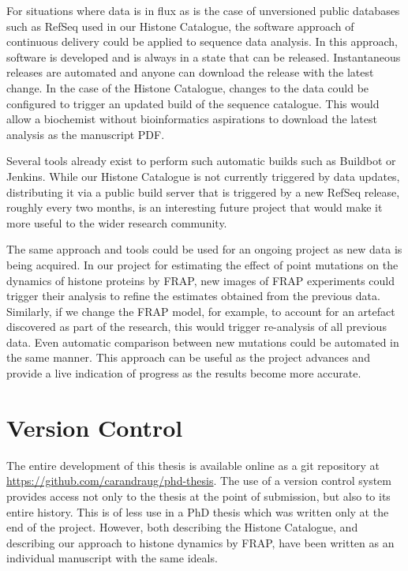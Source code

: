 For situations where data is in
flux as is the case of unversioned public databases such as RefSeq
used in our Histone Catalogue, the software
approach of continuous delivery could be applied to sequence data
analysis.  In this approach,
software is developed and is always in a state that can be
released.  Instantaneous releases are automated and anyone can download the
release with the latest change.  In the case of the Histone Catalogue,
changes to the data could be configured to
trigger an updated
build of the sequence catalogue.  This would allow a biochemist
without bioinformatics aspirations to download the latest analysis as
the manuscript PDF.

Several tools already exist to perform such automatic builds such as
Buildbot or Jenkins.  While our Histone Catalogue is not currently
triggered by data updates, distributing it via a public build server
that is triggered by a new RefSeq release, roughly every two months,
is an interesting future project that would make it more useful to the
wider research community.

The same approach and tools could be used for an ongoing project as
new data is being acquired.  In our project for
estimating the effect of point mutations on the dynamics of histone
proteins by FRAP, new images of FRAP experiments could trigger
their analysis to refine the
estimates obtained from the previous data.  Similarly, if we change
the FRAP model, for example, to account for an artefact
discovered as part of the research, this would trigger re-analysis of
all previous data.  Even automatic comparison between new mutations
could be automated in the same manner.
This approach can be useful as the project
advances and provide a live indication of progress as the results become more
accurate.

\section{Version Control}

The entire development of this thesis is available online as a git
repository at \url{https://github.com/carandraug/phd-thesis}.  The use
of a version control system provides access not only to the thesis at the
point of submission, but also to its entire history.
This is of less use
in a PhD thesis which was written only at the end of the
project.
However, both  describing the Histone
Catalogue, and  describing our approach to histone
dynamics by FRAP,
have been written as an individual
manuscript with the same ideals.


